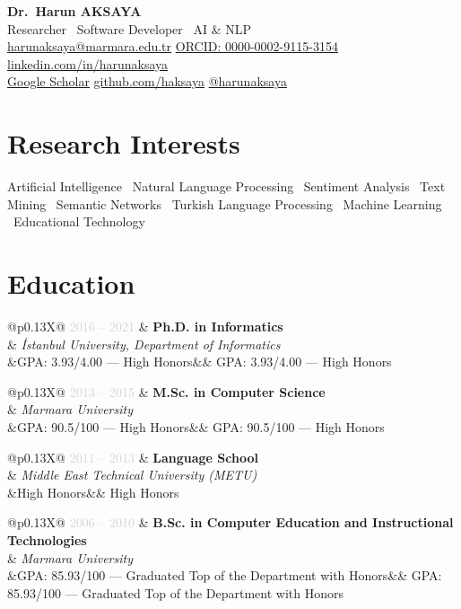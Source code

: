 \documentclass[11pt, a4paper]{article}
\makeatletter
\newcommand{\cventry}[4]{%
  \begin{tabularx}{\textwidth}{@{}p{0.13\textwidth}X@{}}
    \textcolor{lightgray}{\small #1} & \textbf{#2} \\
    & \textit{\small #3} \\
    \ifx&#4&\else & \small #4 \\ \fi
  \end{tabularx}
  \vspace{3pt}
}
\makeatother
\begin{document}

\begin{center}
  {\Huge\sffamily\bfseries\color{accentblue} Dr.\ Harun AKSAYA}\\[6pt]
  {\large\sffamily Researcher \textperiodcentered\ Software Developer \textperiodcentered\ AI \& NLP}\\[8pt]
  {\small
    \textcolor{lightgray}{
      \href{mailto:harunaksaya@marmara.edu.tr}{harunaksaya@marmara.edu.tr}
      \quad\textbullet\quad
      \href{https://orcid.org/0000-0002-9115-3154}{ORCID: 0000-0002-9115-3154}
      \quad\textbullet\quad
      \href{https://linkedin.com/in/harunaksaya}{linkedin.com/in/harunaksaya}
    }\\[2pt]
    \textcolor{lightgray}{
      \href{https://scholar.google.com/citations?user=VWJfY6kAAAAJ}{Google Scholar}
      \quad\textbullet\quad
      \href{https://github.com/haksaya}{github.com/haksaya}
      \quad\textbullet\quad
      \href{https://twitter.com/harunaksaya}{@harunaksaya}
    }
  }
\end{center}

\vspace{6pt}

\section{Research Interests}

Artificial Intelligence \textperiodcentered\
Natural Language Processing \textperiodcentered\
Sentiment Analysis \textperiodcentered\
Text Mining \textperiodcentered\
Semantic Networks \textperiodcentered\
Turkish Language Processing \textperiodcentered\
Machine Learning \textperiodcentered\
Educational Technology

\section{Education}

\cventry{2016 -- 2021}{Ph.D. in Informatics}{İstanbul University, Department of Informatics}{GPA: 3.93/4.00 — High Honors}

\cventry{2013 -- 2015}{M.Sc. in Computer Science}{Marmara University}{GPA: 90.5/100 — High Honors}

\cventry{2011 -- 2013}{Language School}{Middle East Technical University (METU)}{High Honors}

\cventry{2006 -- 2010}{B.Sc. in Computer Education and Instructional Technologies}{Marmara University}{GPA: 85.93/100 — Graduated Top of the Department with Honors}
\end{document}
